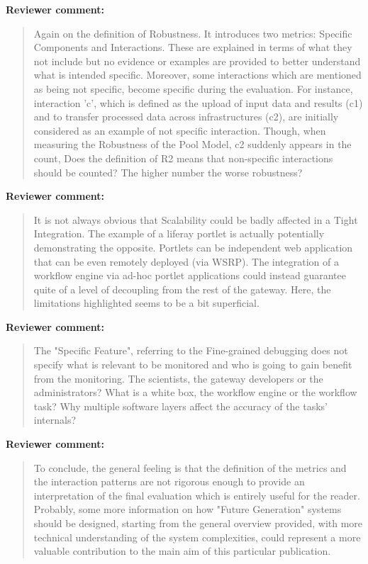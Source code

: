 \documentclass[a4]{letter}
\newenvironment{review}%
{\textbf{Reviewer comment:}\begin{quote}}%
{\end{quote}}%
\begin{document}
\begin{letter}{}
\begin{review}
Again on the definition of Robustness. It introduces two metrics: Specific Components and Interactions. These are explained in terms of what they not include but no evidence or examples are provided to better understand what is intended specific. Moreover, some interactions which are mentioned as being not specific, become specific during the evaluation. For instance, interaction 'c', which is defined as the upload of input data and results (c1) and to transfer processed data across infrastructures (c2), are initially considered as an example of not specific interaction. Though, when measuring the Robustness of the Pool Model,  c2 suddenly appears in the count,  Does the definition of R2 means that non-specific interactions should be counted? The higher number the worse robustness?
\end{review}

\begin{review}
It is not always obvious that Scalability could be badly affected in a Tight Integration. The example of a liferay portlet is actually potentially demonstrating the opposite. Portlets can be independent web application that can be even remotely deployed (via WSRP). The integration of a workflow engine via ad-hoc portlet applications could instead guarantee quite of a level of decoupling from the rest of the gateway. Here, the limitations highlighted seems to be a bit superficial.
\end{review}

\begin{review}
The "Specific Feature", referring to the Fine-grained debugging does not specify what is relevant to be monitored and who is going to gain benefit from the monitoring. The scientists, the gateway developers or the administrators? What is a white box, the workflow engine or the workflow task? Why multiple software layers affect the accuracy of the tasks' internals?
\end{review}

\begin{review}
To conclude, the general feeling is that the definition of the metrics and the interaction patterns are not rigorous enough to provide an interpretation of the final evaluation which is entirely useful for the reader. Probably, some more information on how "Future Generation" systems should be designed, starting from the general overview provided, with more technical understanding of the system complexities, could represent a more valuable contribution to the main aim of this particular publication.
\end{review}


\end{letter}
\end{document}
